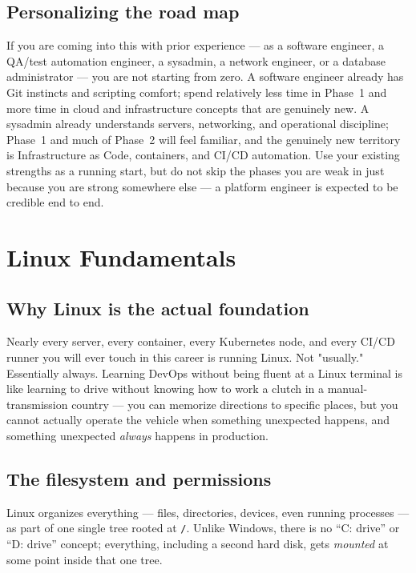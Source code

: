 \documentclass[11pt,twoside,openright]{book}
\begin{document}
\section{Personalizing the road map}

If you are coming into this with prior experience --- as a software engineer, a QA/test
automation engineer, a sysadmin, a network engineer, or a database administrator --- you
are not starting from zero. A software engineer already has Git instincts and scripting
comfort; spend relatively less time in Phase~1 and more time in cloud and infrastructure
concepts that are genuinely new. A sysadmin already understands servers, networking, and
operational discipline; Phase~1 and much of Phase~2 will feel familiar, and the genuinely
new territory is Infrastructure as Code, containers, and CI/CD automation. Use your
existing strengths as a running start, but do not skip the phases you are weak in just
because you are strong somewhere else --- a platform engineer is expected to be
credible end to end.

\chapter{Linux Fundamentals}

\section{Why Linux is the actual foundation}

Nearly every server, every container, every Kubernetes node, and every CI/CD runner you
will ever touch in this career is running Linux. Not "usually." Essentially always.
Learning DevOps without being fluent at a Linux terminal is like learning to drive without
knowing how to work a clutch in a manual-transmission country --- you can memorize
directions to specific places, but you cannot actually operate the vehicle when something
unexpected happens, and something unexpected \emph{always} happens in production.

\section{The filesystem and permissions}

Linux organizes everything --- files, directories, devices, even running processes --- as
part of one single tree rooted at \texttt{/}. Unlike Windows, there is no ``C: drive'' or
``D: drive'' concept; everything, including a second hard disk, gets \emph{mounted} at
some point inside that one tree.
\end{document}
